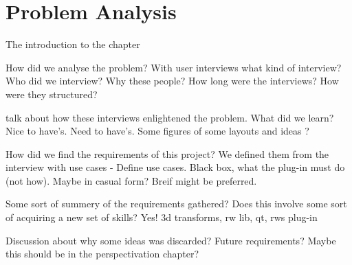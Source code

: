 \section{Problem Analysis}
The introduction to the chapter


How did we analyse the problem?
	With user interviews
		what kind of interview?
		Who did we interview?
			Why these people?
		How long were the interviews?
			How were they structured?

	talk about how these interviews enlightened the problem.
		What did we learn?
			Nice to have's.
			Need to have's.
		Some figures of some layouts and ideas ?
	

How did we find the requirements of this project?
	We defined them from the interview with use cases - 
		Define use cases.
			Black box, what the plug-in must do (not how).
				Maybe in casual form? Breif might be preferred.
	
	Some sort of summery of the requirements gathered?
	Does this involve some sort of acquiring a new set of skills?
		Yes!
			3d transforms, rw lib, qt, rws plug-in

Discussion about why some ideas was discarded?
	Future requirements? Maybe this should be in the perspectivation chapter?









